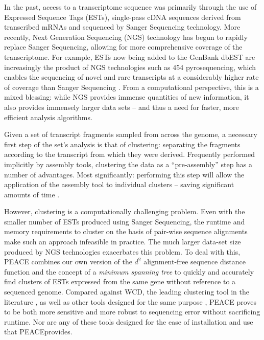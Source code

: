 \documentclass[a4,center,fleqn]{NAR}
\newcommand{\peace} {{\small PEACE}}
\newcommand{\wcd} {{\small WCD}}
\begin{document}
In the past, access to a transcriptome sequence was primarily
through the use of Expressed Sequence Tags (ESTs), single-pass cDNA
sequences derived from transcribed mRNAs and sequenced by Sanger
Sequencing technology.  More recently, Next Generation Sequencing
(NGS) technology has begun to rapidly replace Sanger Sequencing,
allowing for more comprehensive coverage of the transcriptome.  For
example, ESTs now being added to the GenBank dbEST are increasingly
the product of NGS technologies such as 454 pyrosequencing, which
enables the sequencing of novel and rare transcripts at a considerably
higher rate of coverage than Sanger Sequencing
\cite{Cheung2006,Emrich2007}.  From a computational perspective, this
is a mixed blessing: while NGS provides immense quantities of new
information, it also provides immensely larger data sets -- and thus a
need for faster, more efficient analysis algorithms.

\enlargethispage{-65.1pt}

Given a set of transcript fragments sampled from across the genome, a
necessary first step of the set's analysis is that of clustering: separating
the fragments according to the transcript from which they were
derived.  Frequently performed implicitly by assembly tools,
clustering the data as a ``pre-assembly'' step has a number of
advantages.  Most significantly: performing this step will
allow the application of the assembly tool to individual clusters --
saving significant amounts of time \cite{Hazelhurst08a}.  

However, clustering is a computationally challenging problem.  Even
with the smaller number of ESTs produced using Sanger Sequencing, the
runtime and memory requirements to cluster on the basis of pair-wise
sequence alignments make such an approach infeasible in practice.  The
much larger data-set size produced by NGS technologies exacerbates
this problem.  To deal with this, \peace\/ combines our own version of
the $d^2$ alignment-free sequence distance function \cite{Hide94} and
the concept of a {\it minimum spanning tree} \cite{Prim57} to quickly
and accurately find clusters of ESTs expressed from the same gene
without reference to a sequenced genome.  Compared against \wcd, the
leading clustering tool in the literature \cite{Hazelhurst08a}, as well as
other tools designed for the same purpose 
\cite{Burke99,Slater00,Huang99,Parkinson02,Kalyanaraman03,Malde03,
  Ptitsyn05,Hazelhurst08a,Picardi09}, \peace\/ proves to be both more
sensitive and more robust to sequencing error without sacrificing
runtime.  Nor are any of these tools designed for the ease of installation
and use that \peace provides.
\end{document}
